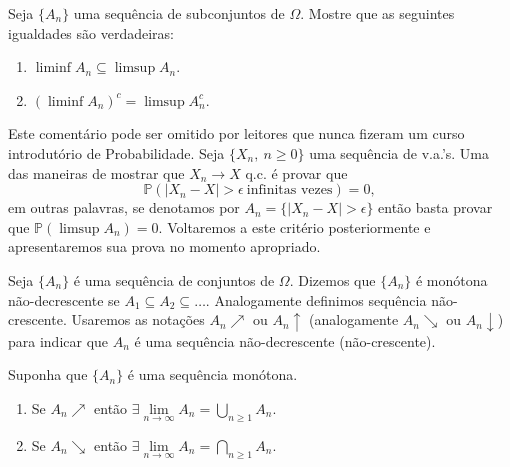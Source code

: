 \begin{exercicio} 
Seja $\{A_n\}$ uma sequência de subconjuntos de $\Omega$.
Mostre que as seguintes igualdades são verdadeiras:
%
\begin{enumerate}
\item $\liminf A_n \subseteq \limsup A_n$.
\item $\left( \liminf A_n \right)^c = \limsup A_n^c$. 
\end{enumerate}
\end{exercicio}







\begin{observacao} Este comentário pode ser omitido 
por leitores que nunca fizeram um curso introdutório 
de Probabilidade.
Seja $\{X_n,\ n\geqslant 0\}$ uma sequência de v.a.'s.
Uma das maneiras de mostrar que $X_n \to X$ q.c. 
é provar que   
\[
	\mathbb{P}( |X_n-X| > \epsilon \ \text{infinitas vezes} )=0,
\] 
em outras palavras, 
se denotamos por $A_n= \{ |X_n-X|> \epsilon\}$ 
então basta provar que $\mathbb{P} (\limsup A_n )=0$.
Voltaremos a este critério posteriormente e apresentaremos
sua prova no momento apropriado.
\end{observacao}







\begin{definicao}
Seja $\{A_n\}$ é uma sequência de conjuntos de $\Omega$. 
Dizemos que $\{A_n\}$ é monótona não-decrescente 
se $A_1 \subseteq A_2 \subseteq \ldots$.
Analogamente definimos sequência não-crescente.
Usaremos as notações $A_n \nearrow$ ou $A_n \uparrow$ 
(analogamente $A_n\searrow$ ou $A_n \downarrow$)
para indicar que $A_n$ é uma sequência 
não-decrescente (não-crescente).
\end{definicao}







\begin{proposicao}
 Suponha que $\{A_n\}$ é uma sequência monótona.
 \begin{enumerate}
 \item Se $A_n \nearrow$ então 
 	$\exists \lim \limits_{n \to \infty} A_n
 	= 
 	\displaystyle\bigcup_{n\geqslant 1} {A_n}$.
 	
 \item Se $A_n \searrow$ então 
 	$\exists \lim \limits_{n \to \infty} A_n
 	= 
 	\displaystyle\bigcap_{n\geqslant 1} {A_n}$.
 \end{enumerate}
\end{proposicao}


